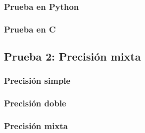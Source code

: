 \subsubsection{Prueba en Python}


\subsubsection{Prueba en C}


\newpage
\subsection{Prueba 2: Precisión mixta}
\label{prueba:mixta}
\subsubsection{Precisión simple}


\newpage
\subsubsection{Precisión doble}


\newpage
\subsubsection{Precisión mixta}

\fi